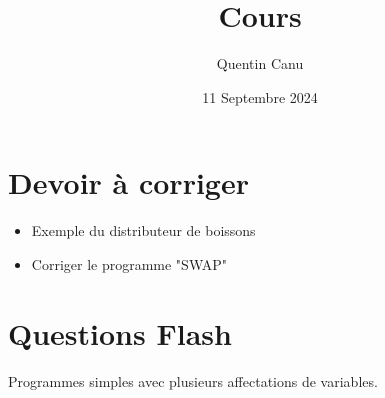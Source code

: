 \documentclass{article}
\title{Cours}
\date{11 Septembre 2024}
\author{Quentin Canu}
\begin{document}
\maketitle

\section{Devoir à corriger}
\begin{itemize}
\item Exemple du distributeur de boissons  
\item Corriger le programme "SWAP"
\end{itemize}

\section{Questions Flash}
Programmes simples avec plusieurs affectations de variables.
\end{document}
